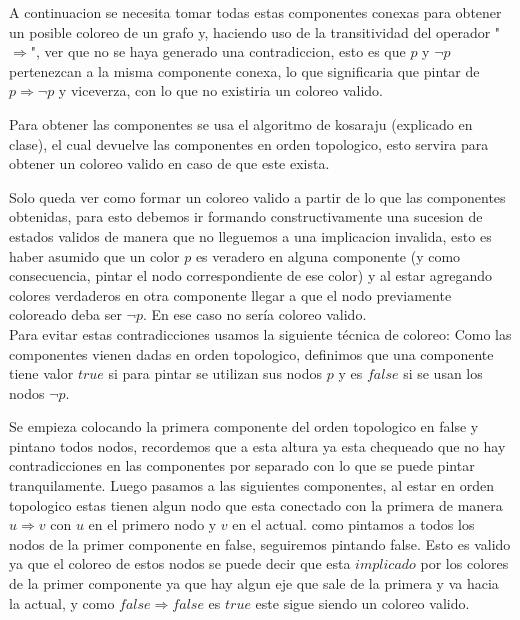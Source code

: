 
A continuacion se necesita tomar todas estas componentes conexas para obtener un posible coloreo de un grafo y, haciendo uso de la transitividad del operador "$\Rightarrow$", ver que no se haya generado una contradiccion, esto es que $p$ y $\neg p$ pertenezcan a la misma componente conexa, lo que significaria que pintar de $p \Rightarrow \neg p$ y viceverza, con lo que no existiria un coloreo valido.


Para obtener las componentes se usa el algoritmo de kosaraju (explicado en clase), el cual devuelve las componentes en orden topologico, esto servira para obtener un coloreo valido en caso de que este exista.

Solo queda ver como formar un coloreo valido a partir de lo que las componentes obtenidas, para esto debemos ir formando constructivamente una sucesion de estados validos de manera que no lleguemos a una implicacion invalida, esto es haber asumido que un color $p$ es veradero en alguna componente (y como consecuencia, pintar el nodo correspondiente de ese color) y al estar agregando colores verdaderos en otra componente llegar a que el nodo previamente coloreado deba ser $\neg p$. En ese caso no ser\'ia coloreo valido. \\

Para evitar estas contradicciones usamos la siguiente t\'ecnica de coloreo: Como las componentes vienen dadas en orden topologico, definimos que una componente tiene valor $true$ si para pintar se utilizan sus nodos $p$ y es $false$ si se usan los nodos $\neg p$.


Se empieza colocando la primera componente del orden topologico en false y pintano todos nodos, recordemos que a esta altura ya esta chequeado que no hay contradicciones en las componentes por separado con lo que se puede pintar tranquilamente. Luego pasamos a las siguientes componentes, al estar en orden topologico estas tienen algun nodo que esta conectado con la primera de manera $u \Rightarrow v$ con $u$ en el primero nodo y $v$ en el actual. como pintamos a todos los nodos de la primer componente en false, seguiremos pintando false. Esto es valido ya que el coloreo de estos nodos se puede decir que esta $implicado$ por los colores de la primer componente ya que hay algun eje que sale de la primera y va hacia la actual, y como $false \Rightarrow false$ es $true$ este sigue siendo un coloreo valido. \\

